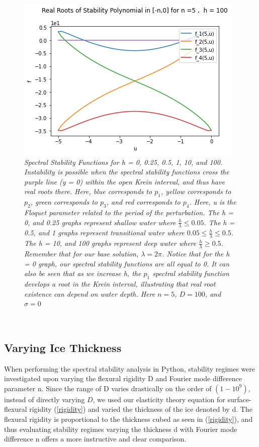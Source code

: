 \documentclass{article}
\begin{document}
\begin{figure}[hbt!]
\includegraphics[width=.47\textwidth]{h6.png}\hfill
\vspace{-20}
\caption{\emph{Spectral Stability Functions for h = 0, 0.25, 0.5, 1, 10, and 100. Instability is possible when the spectral stability functions cross the purple line (y = 0) within the open Krein interval, and thus have real roots there. Here, blue corresponds to \(p_1\), yellow corresponds to \(p_2\), green corresponds to \(p_3\), and red corresponds to \(p_4\). Here, u is the Floquet parameter related to the period of the perturbation. The h = 0, and 0.25 graphs represent shallow water where \(\frac{h}{\lambda} \leq 0.05\). The h = 0.5, and 1 graphs represent transitional water where \(0.05 \leq \frac{h}{\lambda} \leq 0.5\). The h = 10, and 100 graphs represent deep water where \(\frac{h}{\lambda} \geq 0.5\). Remember that for our base solution, \(\lambda = 2 \pi\). Notice that for the h = 0 graph, our spectral stability functions are all equal to 0. It can also be seen that as we increase h, the \(p_1\) spectral stability function develops a root in the Krein interval, illustrating that real root existence can depend on water depth. Here \(n = 5\), \(D = 100\), and \(\sigma = 0\)}} \label{hvary}
\end{figure}



\\

\clearpage

\subsection{Varying Ice Thickness}

When performing the spectral stability analysis in Python, stability regimes were investigated upon varying the flexural rigidity D and Fourier mode difference parameter n. Since the range of D varies drastically on the order of \((1-10^9)\), instead of directly varying \(D\), we used our elasticity theory equation for surface-flexural rigidity (\ref{rigidity}) and varied the thickness of the ice denoted by d. The flexural rigidity is proportional to the thickness cubed as seen in (\ref{rigidity}), and thus evaluating stability regimes varying the thickness d with Fourier mode difference n offers a more instructive and clear comparison. \\
\end{document}
